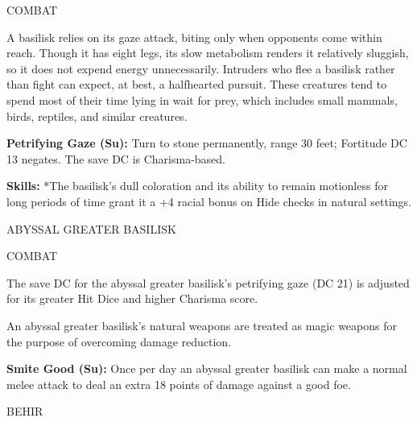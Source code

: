 \documentclass{article}
\begin{document}
COMBAT

A basilisk relies on its gaze attack, biting only when opponents come within reach. 
Though it has eight legs, its slow metabolism renders it relatively sluggish, so 
it does not expend energy unnecessarily. Intruders who flee a basilisk rather than 
fight can expect, at best, a halfhearted pursuit. These creatures tend to spend 
most of their time lying in wait for prey, which includes small mammals, birds, 
reptiles, and similar creatures.

\textbf{Petrifying Gaze (Su):} Turn to stone permanently, range 30 feet; Fortitude 
DC 13 negates. The save DC is Charisma-based.

\textbf{Skills:} *The basilisk's dull coloration and its ability to remain motionless 
for long periods of time grant it a +4 racial bonus on Hide checks in natural settings.

\vspace{12pt}
ABYSSAL GREATER BASILISK

COMBAT

The save DC for the abyssal greater basilisk's petrifying gaze (DC 21) is adjusted 
for its greater Hit Dice and higher Charisma score.

An abyssal greater basilisk's natural weapons are treated as magic weapons for 
the purpose of overcoming damage reduction.

\textbf{Smite Good (Su): }Once per day an abyssal greater basilisk can make a normal 
melee attack to deal an extra 18 points of damage against a good foe.

\vspace{12pt}
{\LARGE{}BEHIR}
\end{document}
